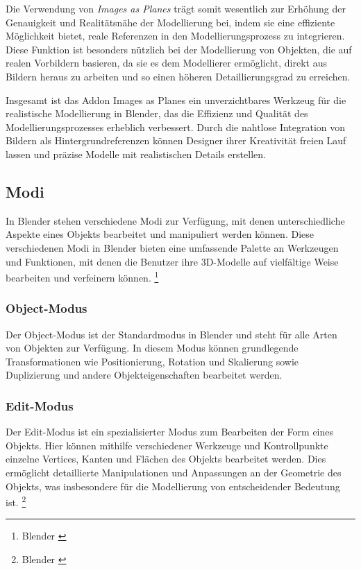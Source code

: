 Die Verwendung von \textit{Images as Planes} trägt somit wesentlich zur Erhöhung der Genauigkeit und Realitätsnähe der
Modellierung bei, indem sie eine effiziente Möglichkeit bietet, reale Referenzen in den Modellierungsprozess zu integrieren.
Diese Funktion ist besonders nützlich bei der Modellierung von Objekten, die auf realen Vorbildern basieren, da sie es
dem Modellierer ermöglicht, direkt aus Bildern heraus zu arbeiten und so einen höheren Detaillierungsgrad zu erreichen.

Insgesamt ist das Addon Images as Planes ein unverzichtbares Werkzeug für die realistische Modellierung in Blender,
das die Effizienz und Qualität des Modellierungsprozesses erheblich verbessert. Durch die nahtlose Integration von Bildern
als Hintergrundreferenzen können Designer ihrer Kreativität freien Lauf lassen und präzise Modelle mit realistischen
Details erstellen.

\subsection{Modi}
In Blender stehen verschiedene Modi zur Verfügung, mit denen unterschiedliche Aspekte eines Objekts bearbeitet und
manipuliert werden können. Diese verschiedenen Modi in Blender bieten eine umfassende Palette an Werkzeugen und Funktionen,
mit denen die Benutzer ihre 3D-Modelle auf vielfältige Weise bearbeiten und verfeinern können. \footnote{Blender \cite{Modi}}

\subsubsection{Object-Modus}
Der Object-Modus ist der Standardmodus in Blender und steht für alle Arten von Objekten zur Verfügung. In diesem Modus
können grundlegende Transformationen wie Positionierung, Rotation und Skalierung sowie Duplizierung und andere
Objekteigenschaften bearbeitet werden.

\subsubsection{Edit-Modus}
Der Edit-Modus ist ein spezialisierter Modus zum Bearbeiten der Form eines Objekts. Hier können mithilfe verschiedener
Werkzeuge und Kontrollpunkte einzelne Vertices, Kanten und Flächen des Objekts bearbeitet werden. Dies ermöglicht
detaillierte Manipulationen und Anpassungen an der Geometrie des Objekts, was insbesondere für die Modellierung von
entscheidender Bedeutung ist. \footnote{Blender \cite{Vertices}}

